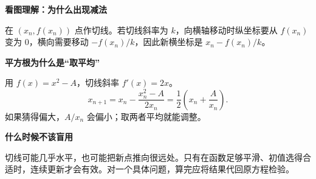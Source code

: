 \clearpage
\begin{explanationbox}
\textbf{\textcolor{CExplanation}{看图理解：为什么出现减法}}
\par\medskip
\begin{center}

\end{center}
\medskip
在 $(x_n,f(x_n))$ 点作切线。若切线斜率为 $k$，向横轴移动时纵坐标要从 $f(x_n)$ 变为 $0$，横向需要移动 $-f(x_n)/k$，因此新横坐标是 $x_n-f(x_n)/k$。
\end{explanationbox}
\clearpage
\begin{explanationbox}
\textbf{\textcolor{CExplanation}{平方根为什么是“取平均”}}
\par\medskip
\begin{center}

\end{center}
\medskip
用 $f(x)=x^2-A$，切线斜率 $f'(x)=2x$。\[x_{n+1}=x_n-\frac{x_n^2-A}{2x_n}=\frac12\left(x_n+\frac A{x_n}\right).\]如果猜得偏大，$A/x_n$ 会偏小；取两者平均就能调整。
\end{explanationbox}
\clearpage
\begin{explanationbox}
\textbf{\textcolor{CExplanation}{什么时候不该盲用}}
\par\medskip
\begin{center}

\end{center}
\medskip
切线可能几乎水平，也可能把新点推向很远处。只有在函数足够平滑、初值选得合适时，连续更新才会有效。对一个具体问题，算完应将结果代回原方程检验。
\end{explanationbox}
